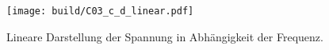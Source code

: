 %
\begin{figure}[H]
    \centering
    \texttt{[image: build/C03\_c\_d\_linear.pdf]}
    \caption{Lineare Darstellung der Spannung in Abhängigkeit der Frequenz.}
    \label{fig:plot_spannung_linear}
\end{figure}


